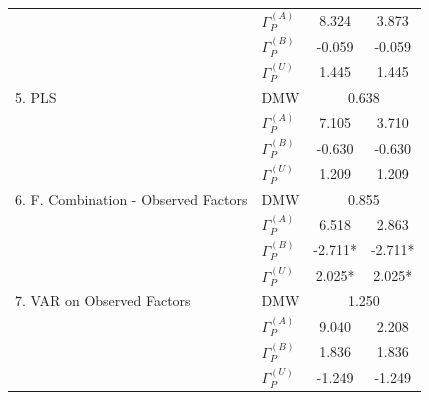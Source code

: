 \documentclass[11pt]{article}
\renewcommand{\baselinestretch}{1.5}
\begin{document}
\begin{table}
\begin{tabular}{|l|l|c|c|}
& $\Gamma_P^{(A)}$&8.324&3.873\\                                       
& $\Gamma_P^{(B)}$&-0.059&-0.059\\                                     
& $\Gamma_P^{(U)}$&1.445&1.445\\                                       
\hline                                                                 
5. PLS                              & DMW&\multicolumn{2}{|c|}{0.638}\\
\hline                                                                 
& $\Gamma_P^{(A)}$&7.105&3.710\\                                       
& $\Gamma_P^{(B)}$&-0.630&-0.630\\                                     
& $\Gamma_P^{(U)}$&1.209&1.209\\                                       
\hline                                                                 
6. F. Combination - Observed Factors& DMW&\multicolumn{2}{|c|}{0.855}\\
\hline                                                                 
& $\Gamma_P^{(A)}$&6.518&2.863\\                                       
& $\Gamma_P^{(B)}$&-2.711*&-2.711*\\                                   
& $\Gamma_P^{(U)}$&2.025*&2.025*\\                                     
\hline                                                                 
7. VAR on Observed Factors          & DMW&\multicolumn{2}{|c|}{1.250}\\
\hline                                                                 
& $\Gamma_P^{(A)}$&9.040&2.208\\                                       
& $\Gamma_P^{(B)}$&1.836&1.836\\                                       
& $\Gamma_P^{(U)}$&-1.249&-1.249\\                                     
\hline                                                                 
\end{tabular}                                                          
\end{table}   

\clearpage
\renewcommand{\baselinestretch}{1.5} \normalsize 
\end{document}
